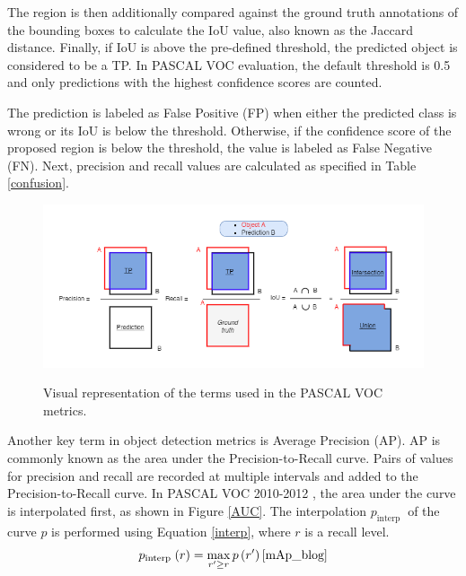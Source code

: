 The region is then additionally compared against the ground truth annotations of the bounding boxes  to calculate the IoU value, also known as the Jaccard distance. Finally, if IoU is above the pre-defined threshold, the predicted object is considered to be a TP. In PASCAL VOC evaluation, the default threshold is 0.5 \cite{mAp_blog} and only predictions with the highest confidence scores are counted. 

The prediction is labeled as False Positive (FP) when either the predicted class is wrong or its IoU is below the threshold. Otherwise, if the confidence score of the proposed region is below the threshold, the value is labeled as False Negative (FN). Next, precision and recall values are calculated as specified in Table \ref{confusion}.


\begin{figure}[htb]
	\begin{center}
		\includegraphics[width=16cm]{./IOU.png}
	\end{center}
	\caption{Visual representation of the terms used in the PASCAL VOC metrics.}
	\begin{center}
		\label{iou}
	\end{center}
\end{figure}


Another key term in object detection metrics is Average Precision (AP). AP is commonly known as the area under the Precision-to-Recall curve. Pairs of values for precision and recall are recorded at multiple intervals and added to the Precision-to-Recall curve. In PASCAL VOC 2010-2012 \cite{Everingham10}, the area under the curve is interpolated first, as shown in Figure \ref{AUC}. The interpolation $p_{\text {interp }}$ of the curve $p$ is performed using Equation \ref{interp}, where $r$ is a recall level. 
\begin{equation}
p_{\text {interp }}(r)=\max _{r^{\prime} \geq r} p\left(r^{\prime}\right)
\label{interp}
\cite{mAp_blog}  
\end{equation}


